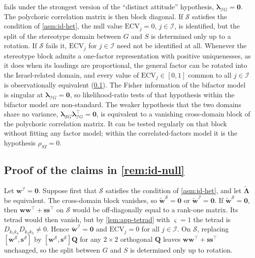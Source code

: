 \begin{remark}\label{rem:id-null}
 fails under the strongest version of the ``distinct attitude'' hypothesis, $\bm\lambda_{\mathcal IG}=\bm0$. The polychoric correlation matrix is then block diagonal. If $\mathcal S$ satisfies the condition of \cref{asm:id-het}, the null value $\mathrm{ECV}_j=0$, $j\in\mathcal I$, is identified, but the split of the stereotype domain between $G$ and $S$ is determined only up to a rotation. If $\mathcal S$ fails it, $\mathrm{ECV}_j$ for $j\in\mathcal I$ need not be identified at all. Whenever the stereotype block admits a one-factor representation with positive uniquenesses, as it does when its loadings are proportional, the general factor can be rotated into the Israel-related domain, and every value of $\mathrm{ECV}_j\in[0,1]$ common to all $j\in\mathcal I$ is observationally equivalent (\cref{app:pm-null}). The Fisher information of the bifactor model is singular at $\bm\lambda_{\mathcal IG}=\bm0$, so likelihood-ratio tests of that hypothesis within the bifactor model are non-standard. The weaker hypothesis that the two domains share no variance, $\bm\lambda_{\mathcal SG}\bm\lambda_{\mathcal IG}^\top=\bm0$, is equivalent to a vanishing cross-domain block of the polychoric correlation matrix. It can be tested regularly on that block without fitting any factor model; within the correlated-factors model it is the hypothesis $\rho_{SI}=0$.
\end{remark}

\subsection{Proof of the claims in \texorpdfstring{\cref{rem:id-null}}{the remark on a null general factor}}\label{app:pm-null}

Let $\bm w^{\mathcal I}=\bm0$. Suppose first that $\mathcal S$ satisfies the condition of \cref{asm:id-het}, and let $\tilde{\bm\Lambda}$ be equivalent. The cross-domain block vanishes, so $\tilde{\bm w}^{\mathcal S}=\bm0$ or $\tilde{\bm w}^{\mathcal I}=\bm0$. If $\tilde{\bm w}^{\mathcal S}=\bm0$, then $\bm w\bm w^\top+\bm s\bm s^\top$ on $\mathcal S$ would be off-diagonally equal to a rank-one matrix. Its tetrad would then vanish, but by \cref{lem:app-tetrad} with $\varsigma=1$ the tetrad is $D_{k_1k_4}D_{k_2k_3}\neq0$. Hence $\tilde{\bm w}^{\mathcal I}=\bm0$ and $\mathrm{ECV}_j=0$ for all $j\in\mathcal I$. On $\mathcal S$, replacing $[\bm w^{\mathcal S},\bm s^{\mathcal S}]$ by $[\bm w^{\mathcal S},\bm s^{\mathcal S}]\bm Q$ for any $2\times2$ orthogonal $\bm Q$ leaves $\bm w\bm w^\top+\bm s\bm s^\top$ unchanged, so the split between $G$ and $S$ is determined only up to rotation.

